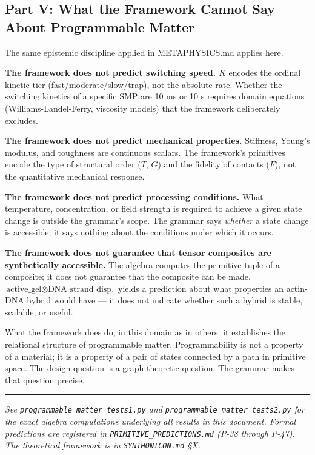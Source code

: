 \documentclass[12pt,a4paper]{article}
\begin{document}
\subsection{Part V: What the Framework Cannot Say About Programmable Matter}

The same epistemic discipline applied in METAPHYSICS.md applies here.

\textbf{The framework does not predict switching speed.} $K$ encodes the ordinal kinetic tier (fast/moderate/slow/trap), not the absolute rate. Whether the switching kinetics of a specific SMP are 10 ms or 10 s requires domain equations (Williams-Landel-Ferry, viscosity models) that the framework deliberately excludes.

\textbf{The framework does not predict mechanical properties.} Stiffness, Young's modulus, and toughness are continuous scalars. The framework's primitives encode the type of structural order ($T$, $G$) and the fidelity of contacts ($F$), not the quantitative mechanical response.

\textbf{The framework does not predict processing conditions.} What temperature, concentration, or field strength is required to achieve a given state change is outside the grammar's scope. The grammar says \emph{whether} a state change is accessible; it says nothing about the conditions under which it occurs.

\textbf{The framework does not guarantee that tensor composites are synthetically accessible.} The algebra computes the primitive tuple of a composite; it does not guarantee that the composite can be made. $\text{active\_gel} \otimes \text{DNA strand disp.}$ yields a prediction about what properties an actin-DNA hybrid would have --- it does not indicate whether such a hybrid is stable, scalable, or useful.

What the framework does do, in this domain as in others: it establishes the relational structure of programmable matter. Programmability is not a property of a material; it is a property of a pair of states connected by a path in primitive space. The design question is a graph-theoretic question. The grammar makes that question precise.

\begin{center}
\rule{0.5\textwidth}{0.4pt}
\end{center}

\emph{See \texttt{programmable\_matter\_tests1.py} and \texttt{programmable\_matter\_tests2.py} for the exact algebra computations underlying all results in this document. Formal predictions are registered in \texttt{PRIMITIVE\_PREDICTIONS.md} (P-38 through P-47). The theoretical framework is in \texttt{SYNTHONICON.md} §X.}
\end{document}
